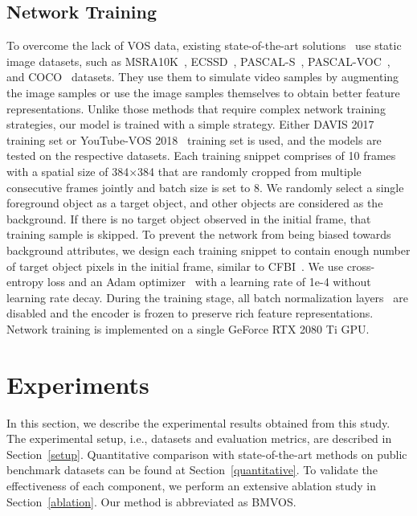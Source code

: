 \documentclass[10pt,twocolumn,letterpaper]{article}
\begin{document}
	\subsection{Network Training}
	\label{network training}
	To overcome the lack of VOS data, existing state-of-the-art solutions~\cite{STM, KMN, CFBI, RMNet} use static image datasets, such as MSRA10K~\cite{MSRA10K}, ECSSD~\cite{ECSSD}, PASCAL-S~\cite{PASCAL-S}, PASCAL-VOC~\cite{PASCAL-VOC}, and COCO~\cite{COCO} datasets. They use them to simulate video samples by augmenting the image samples or use the image samples themselves to obtain better feature representations. Unlike those methods that require complex network training strategies, our model is trained with a simple strategy. Either DAVIS 2017~\cite{DAVIS2017} training set or YouTube-VOS 2018~\cite{YTVOS} training set is used, and the models are tested on the respective datasets. Each training snippet comprises of 10 frames with a spatial size of 384$\times$384 that are randomly cropped from multiple consecutive frames jointly and batch size is set to 8. We randomly select a single foreground object as a target object, and other objects are considered as the background. If there is no target object observed in the initial frame, that training sample is skipped. To prevent the network from being biased towards background attributes, we design each training snippet to contain enough number of target object pixels in the initial frame, similar to CFBI~\cite{CFBI}. We use cross-entropy loss and an Adam optimizer~\cite{adam} with a learning rate of 1e-4 without learning rate decay. During the training stage, all batch normalization layers~\cite{batchnorm} are disabled and the encoder is frozen to preserve rich feature representations. Network training is implemented on a single GeForce RTX 2080 Ti GPU. 
	
	
	\section{Experiments}
	In this section, we describe the experimental results obtained from this study. The experimental setup, i.e., datasets and evaluation metrics, are described in Section~\ref{setup}.  Quantitative comparison with state-of-the-art methods on public benchmark datasets can be found at Section~\ref{quantitative}. To validate the effectiveness of each component, we perform an extensive ablation study in Section~\ref{ablation}. Our method is abbreviated as BMVOS.
	
	
	
\end{document}
